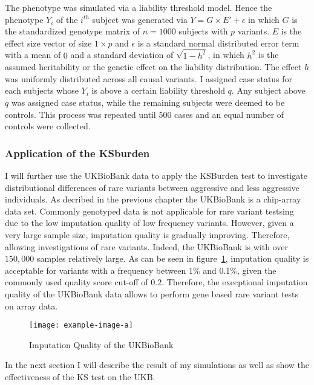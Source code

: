 The phenotype was simulated via a liability threshold model.
Hence the phenotype $Y_i$ of the $i^{th}$ subject was generated via
$Y = G\times E' + \epsilon$
in which $G$ is the standardized genotype matrix of $n=1000$ subjects with $p$ variants.
$E$ is the effect size vector of size $1\times p$ and $\epsilon$ is a standard normal distributed error term with a mean of $0$ and a standard deviation of $\sqrt{1-h^2}$, in which $h^2$ is the assumed heritability or the genetic effect on the liability distribution.
The effect $h$ was uniformly distributed across all causal variants.
I assigned case status for each subjects whose $Y_i$ is above a certain liability threshold $q$.
Any subject above $q$ was assigned case status, while the remaining subjects were deemed to be controls.
This process was repeated until $500$ cases and an equal number of controls were collected.

\subsubsection{Application of the KSburden}
\label{ssub:Application_of_the_KSburden}

I will further use the UKBioBank data to apply the KSBurden test to investigate distributional differences of rare variants between aggressive and less aggressive individuals.
As decribed in the previous chapter the UKBioBank is a chip-array data set.
Commonly genotyped data is not applicable for rare variant testsing due to the low imputation quality of low frequency variants.
However, given a very large sample size, imputation quality is gradually improving.
Therefore, allowing investigations of rare variants.
Indeed, the UKBioBank is with over $150,000$ samples relatively large.
As can be seen in figure~\ref{fig:imputation}, imputation quality is acceptable for variants with a frequency between 1\% and 0.1\%, given the commonly used quality score cut-off of $0.2$.
Therefore, the execptional imputation quality of the UKBioBank data allows to perform gene based rare variant tests on array data.

\begin{figure}[htpb]
  \centering
  \texttt{[image: example-image-a]}
  \caption{Imputation Quality of the UKBioBank}\label{fig:imputation}
\end{figure}

In the next section I will describe the result of my simulations as well as show the effectiveness of the KS test on the UKB\@.
